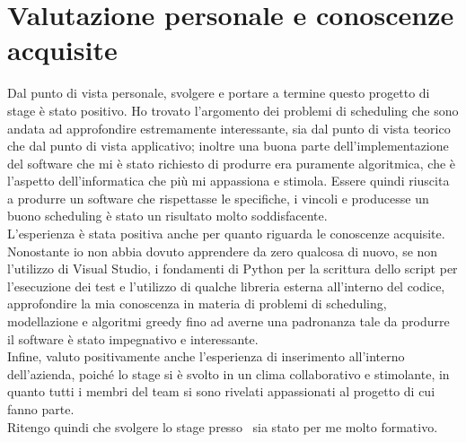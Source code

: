 \section{Valutazione personale e conoscenze acquisite}
Dal punto di vista personale, svolgere e portare a termine questo progetto di stage è stato positivo. Ho trovato l'argomento dei problemi di scheduling che sono andata ad approfondire estremamente interessante, sia dal punto di vista teorico che dal punto di vista applicativo; inoltre una buona parte dell'implementazione del software che mi è stato richiesto di produrre era puramente algoritmica, che è l'aspetto dell'informatica che più mi appassiona e stimola. Essere quindi riuscita a produrre un software che rispettasse le specifiche, i vincoli e producesse un buono scheduling è stato un risultato molto soddisfacente.\\
L'esperienza è stata positiva anche per quanto riguarda le conoscenze acquisite. Nonostante io non abbia dovuto apprendere da zero qualcosa di nuovo, se non l'utilizzo di Visual Studio, i fondamenti di Python per la scrittura dello script per l'esecuzione dei test e l'utilizzo di qualche libreria esterna all'interno del codice, approfondire la mia conoscenza in materia di problemi di scheduling, modellazione e algoritmi greedy fino ad averne una padronanza tale da produrre il software è stato impegnativo e interessante. \\
Infine, valuto positivamente anche l'esperienza di inserimento all'interno dell'azienda, poiché lo stage si è svolto in un clima collaborativo e stimolante, in quanto tutti i membri del team si sono rivelati appassionati al progetto di cui fanno parte.\\ Ritengo quindi che svolgere lo stage presso \TS\ sia stato per me molto formativo.

